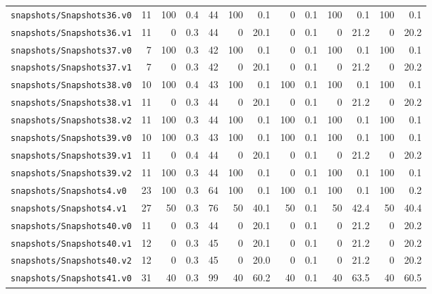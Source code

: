 \documentclass[a4paper,final]{llncs}
\begin{document}
\begin{scriptsize}
\begin{longtable}{l |r *{1}{rr} |r *{4}{rr}}
\verb|snapshots/Snapshots36.v0|  &  11  &  100  &  0.4  &  44  &  100  &  0.1  &  0  &  0.1  &  100  &  0.1  &  100  &  0.1  \\
\verb|snapshots/Snapshots36.v1|  &  11  &  0  &  0.3  &  44  &  0  &  20.1  &  0  &  0.1  &  0  &  21.2  &  0  &  20.2  \\
\verb|snapshots/Snapshots37.v0|  &  7  &  100  &  0.3  &  42  &  100  &  0.1  &  0  &  0.1  &  100  &  0.1  &  100  &  0.1  \\
\verb|snapshots/Snapshots37.v1|  &  7  &  0  &  0.3  &  42  &  0  &  20.1  &  0  &  0.1  &  0  &  21.2  &  0  &  20.2  \\
\verb|snapshots/Snapshots38.v0|  &  10  &  100  &  0.4  &  43  &  100  &  0.1  &  100  &  0.1  &  100  &  0.1  &  100  &  0.1  \\
\verb|snapshots/Snapshots38.v1|  &  11  &  0  &  0.3  &  44  &  0  &  20.1  &  0  &  0.1  &  0  &  21.2  &  0  &  20.2  \\
\verb|snapshots/Snapshots38.v2|  &  11  &  100  &  0.3  &  44  &  100  &  0.1  &  100  &  0.1  &  100  &  0.1  &  100  &  0.1  \\
\verb|snapshots/Snapshots39.v0|  &  10  &  100  &  0.3  &  43  &  100  &  0.1  &  100  &  0.1  &  100  &  0.1  &  100  &  0.1  \\
\verb|snapshots/Snapshots39.v1|  &  11  &  0  &  0.4  &  44  &  0  &  20.1  &  0  &  0.1  &  0  &  21.2  &  0  &  20.2  \\
\verb|snapshots/Snapshots39.v2|  &  11  &  100  &  0.3  &  44  &  100  &  0.1  &  0  &  0.1  &  100  &  0.1  &  100  &  0.1  \\
\verb|snapshots/Snapshots4.v0|  &  23  &  100  &  0.3  &  64  &  100  &  0.1  &  100  &  0.1  &  100  &  0.1  &  100  &  0.2  \\
\verb|snapshots/Snapshots4.v1|  &  27  &  50  &  0.3  &  76  &  50  &  40.1  &  50  &  0.1  &  50  &  42.4  &  50  &  40.4  \\
\verb|snapshots/Snapshots40.v0|  &  11  &  0  &  0.3  &  44  &  0  &  20.1  &  0  &  0.1  &  0  &  21.2  &  0  &  20.2  \\
\verb|snapshots/Snapshots40.v1|  &  12  &  0  &  0.3  &  45  &  0  &  20.1  &  0  &  0.1  &  0  &  21.2  &  0  &  20.2  \\
\verb|snapshots/Snapshots40.v2|  &  12  &  0  &  0.3  &  45  &  0  &  20.0  &  0  &  0.1  &  0  &  21.2  &  0  &  20.2  \\
\verb|snapshots/Snapshots41.v0|  &  31  &  40  &  0.3  &  99  &  40  &  60.2  &  40  &  0.1  &  40  &  63.5  &  40  &  60.5  \\

\end{longtable}
\end{scriptsize}
\end{document}
